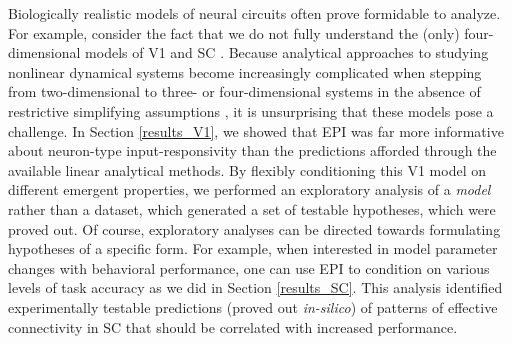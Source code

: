 \documentclass[11pt]{article}
\begin{document}
Biologically realistic models of neural circuits often prove formidable to analyze.
For example, consider the fact that we do not fully understand the (only) four-dimensional models of V1 \cite{litwin2016inhibitory} and SC \cite{duan2018collicular}.
Because analytical approaches to studying nonlinear dynamical systems become increasingly complicated when stepping from two-dimensional to three- or four-dimensional systems in the absence of restrictive simplifying assumptions \cite{strogatz1994nonlinear}, it is unsurprising that these models pose a challenge. 
In Section \ref{results_V1}, we showed that EPI was far more informative about neuron-type input-responsivity than the predictions afforded through the available linear analytical methods.
By flexibly conditioning this V1 model on different emergent properties, we performed an exploratory analysis of a \emph{model} rather than a dataset, which generated a set of testable hypotheses, which were proved out. 
Of course, exploratory analyses can be directed towards formulating hypotheses of a specific form.  For example,  when interested in model parameter changes with behavioral performance, one can use EPI to condition on various levels of task accuracy as we did in Section \ref{results_SC}.
This analysis identified experimentally testable predictions (proved out \textit{in-silico}) of patterns of effective connectivity in SC that should be correlated with increased performance.

\end{document}
